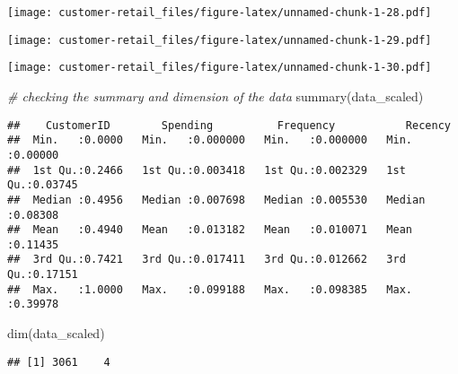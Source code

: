 \documentclass[
]{article}
\newenvironment{Shaded}{\begin{snugshade}}{\end{snugshade}}
\newcommand{\AttributeTok}[1]{\textcolor[rgb]{0.77,0.63,0.00}{#1}}
\newcommand{\CommentTok}[1]{\textcolor[rgb]{0.56,0.35,0.01}{\textit{#1}}}
\newcommand{\FunctionTok}[1]{\textcolor[rgb]{0.00,0.00,0.00}{#1}}
\newcommand{\NormalTok}[1]{#1}
\newcommand{\SpecialCharTok}[1]{\textcolor[rgb]{0.00,0.00,0.00}{#1}}
\begin{document}
\texttt{[image: customer-retail\_files/figure-latex/unnamed-chunk-1-28.pdf]}

\begin{Shaded}
\end{Shaded}

\texttt{[image: customer-retail\_files/figure-latex/unnamed-chunk-1-29.pdf]}

\begin{Shaded}
\end{Shaded}

\texttt{[image: customer-retail\_files/figure-latex/unnamed-chunk-1-30.pdf]}

\begin{Shaded}
\begin{Highlighting}[]
\CommentTok{\# checking the summary and dimension of the data }
\FunctionTok{summary}\NormalTok{(data\_scaled)}
\end{Highlighting}
\end{Shaded}

\begin{verbatim}
##    CustomerID        Spending          Frequency           Recency       
##  Min.   :0.0000   Min.   :0.000000   Min.   :0.000000   Min.   :0.00000  
##  1st Qu.:0.2466   1st Qu.:0.003418   1st Qu.:0.002329   1st Qu.:0.03745  
##  Median :0.4956   Median :0.007698   Median :0.005530   Median :0.08308  
##  Mean   :0.4940   Mean   :0.013182   Mean   :0.010071   Mean   :0.11435  
##  3rd Qu.:0.7421   3rd Qu.:0.017411   3rd Qu.:0.012662   3rd Qu.:0.17151  
##  Max.   :1.0000   Max.   :0.099188   Max.   :0.098385   Max.   :0.39978
\end{verbatim}

\begin{Shaded}
\begin{Highlighting}[]
\FunctionTok{dim}\NormalTok{(data\_scaled)}
\end{Highlighting}
\end{Shaded}

\begin{verbatim}
## [1] 3061    4
\end{verbatim}
\end{document}
